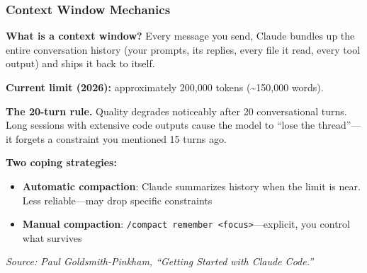 \documentclass[10pt,english,aspectratio=169]{beamer}
\begin{document}
\begin{frame}
\frametitle{Context Window Mechanics}

\textbf{What is a context window?} Every message you send, Claude bundles up the entire conversation history (your prompts, its replies, every file it read, every tool output) and ships it back to itself.

\vspace{0.3cm}

\textbf{Current limit (2026):} approximately 200{,}000 tokens (\textasciitilde 150{,}000 words).

\vspace{0.3cm}

\textbf{The 20-turn rule.} Quality degrades noticeably after 20 conversational turns. Long sessions with extensive code outputs cause the model to ``lose the thread''---it forgets a constraint you mentioned 15 turns ago.

\vspace{0.3cm}

\textbf{Two coping strategies:}
\begin{itemize}
    \item \textbf{Automatic compaction}: Claude summarizes history when the limit is near. Less reliable---may drop specific constraints
    \item \textbf{Manual compaction}: \texttt{/compact remember <focus>}---explicit, you control what survives
\end{itemize}

\vspace{0.1cm}

\textit{Source: Paul Goldsmith-Pinkham, ``Getting Started with Claude Code.''}
\end{frame}
\end{document}
